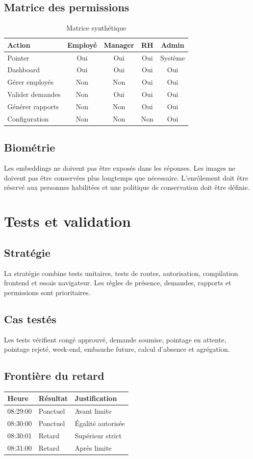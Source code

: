 \documentclass[11pt,a4paper,oneside]{report}
\begin{document}
\section{Matrice des permissions}
\begin{table}[H]\centering\caption{Matrice synthétique}\begin{tabular}{lcccc}\toprule
Action & Employé & Manager & RH & Admin\\\midrule
Pointer & Oui & Oui & Oui & Système\\
Dashboard & Oui & Oui & Oui & Oui\\
Gérer employés & Non & Non & Oui & Oui\\
Valider demandes & Non & Oui & Oui & Oui\\
Générer rapports & Non & Non & Oui & Oui\\
Configuration & Non & Non & Non & Oui\\\bottomrule
\end{tabular}\end{table}
\section{Biométrie}
Les embeddings ne doivent pas être exposés dans les réponses. Les images ne doivent pas être conservées plus longtemps que nécessaire. L'enrôlement doit être réservé aux personnes habilitées et une politique de conservation doit être définie.

\chapter{Tests et validation}
\section{Stratégie}
La stratégie combine tests unitaires, tests de routes, autorisation, compilation frontend et essais navigateur. Les règles de présence, demandes, rapports et permissions sont prioritaires.
\section{Cas testés}
Les tests vérifient congé approuvé, demande soumise, pointage en attente, pointage rejeté, week-end, embauche future, calcul d'absence et agrégation.
\section{Frontière du retard}
\begin{longtable}{p{4cm}p{4cm}p{4cm}}\toprule
Heure & Résultat & Justification\\\midrule
08:29:00 & Ponctuel & Avant limite\\
08:30:00 & Ponctuel & Égalité autorisée\\
08:30:01 & Retard & Supérieur strict\\
08:31:00 & Retard & Après limite\\\bottomrule
\end{longtable}
\end{document}
